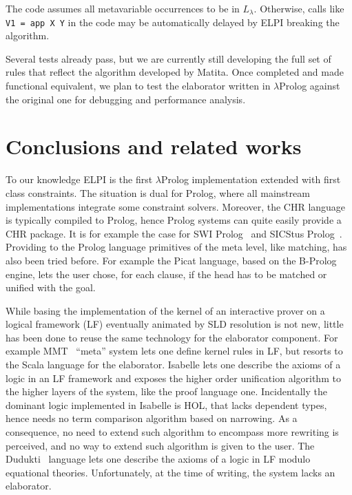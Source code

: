 \documentclass{easychair}
\begin{document}
The code assumes all metavariable occurrences to be in $L_\lambda$. Otherwise, calls like \verb+V1 = app X Y+ in the code may be automatically delayed by ELPI breaking the algorithm.

Several tests already pass, but we are currently still developing the full set of rules that reflect the algorithm developed by Matita. Once completed and made functional equivalent, we plan to test the elaborator written in $\lambda$Prolog against the original one for debugging and performance analysis.

\section{Conclusions and related works}\label{sec:conclusion}

To our knowledge ELPI is the first $\lambda$Prolog implementation extended
with first class constraints.  The situation is dual for Prolog, where all
mainstream implementations integrate some constraint solvers.  Moreover,
the CHR language is typically compiled to Prolog, hence Prolog systems
can quite easily provide a CHR package.  It is for example the case for
SWI Prolog~\cite{SWI} and SICStus Prolog~\cite{SICStus}.  Providing to
the Prolog language primitives of the meta level, like matching, has also
been tried before.  For example the Picat language, based on the
B-Prolog~\cite{Bprolog} engine, lets the user chose, for each clause,
if the head has to be matched or unified with the goal.

While basing the implementation of the kernel of an interactive prover on a
logical framework (LF) eventually animated by SLD resolution is not new, 
little has been done to reuse the same technology for the elaborator
component.  For example MMT~\cite{mmt} ``meta'' system lets one define kernel
rules in LF, but resorts to the Scala language for the elaborator.
Isabelle lets one describe the axioms of a logic in an LF framework and
exposes the higher order unification algorithm to the higher layers of
the system, like the proof language one.  Incidentally the dominant
logic implemented in Isabelle is HOL, that lacks dependent types, hence
needs no term comparison algorithm based on narrowing.  As a consequence,
no need to extend such algorithm to encompass more rewriting is perceived,
and no way to extend such algorithm is given to the user.
The Dudukti~\cite{dedukti} language lets one describe the axioms of a logic
in LF modulo equational theories.  Unfortunately, at the time of writing,
the system lacks an elaborator.
\end{document}

